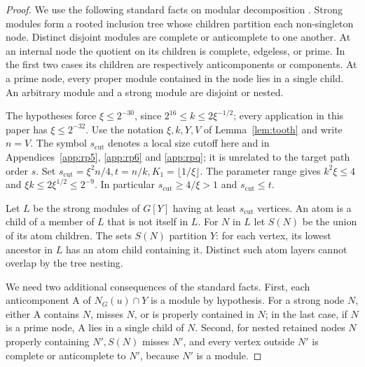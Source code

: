 \documentclass[11pt,a4paper]{article}
\theoremstyle{definition}
\theoremstyle{remark}
\numberwithin{equation}{section}
\begin{document}
\begin{proof}
We use the following standard facts on modular decomposition \cite{gallai}. Strong modules form a rooted inclusion tree whose children partition each non-singleton node. Distinct disjoint modules are complete or anticomplete to one another. At an internal node the quotient on its children is complete, edgeless, or prime. In the first two cases its children are respectively anticomponents or components. At a prime node, every proper module contained in the node lies in a single child. An arbitrary module and a strong module are disjoint or nested.

The hypotheses force \(\xi\le 2^{-30}\), since \(2^{16}\le k\le 2\xi^{-1/2}\); every application in this paper has \(\xi\le 2^{-32}\). Use the notation \(\xi,\allowbreak k,\allowbreak Y,\allowbreak V\) of Lemma~\ref{lem:tooth} and write \(n=V\). The symbol \(s_{\mathrm{cut}}\) denotes a local size cutoff here and in Appendices~\ref{app:rp5}, \ref{app:rp6} and \ref{app:rpq}; it is unrelated to the target path order \(s\). Set \(s_{\mathrm{cut}}=\xi^{2} n/4,\allowbreak  t=n/k,\allowbreak  K_{1}=\lfloor 1/\xi\rfloor\). The parameter range gives \(k^{2} \xi\le\allowbreak 4\) and \(\xi k\le\allowbreak 2\xi^{1/2}\le\allowbreak 2^{-9}\). In particular \(s_{\mathrm{cut}}\ge\allowbreak 4/\xi>1\) and \(s_{\mathrm{cut}}\le\allowbreak t\).

Let \(L\) be the strong modules of \(G[Y]\) having at least \(s_{\mathrm{cut}}\) vertices. An atom is a child of a member of \(L\) that is not itself in \(L\). For \(N\) in \(L\) let \(S(N)\) be the union of its atom children. The sets \(S(N)\) partition \(Y\): for each vertex, its lowest ancestor in \(L\) has an atom child containing it. Distinct such atom layers cannot overlap by the tree nesting.

We need two additional consequences of the standard facts. First, each anticomponent A of \(N_{G}(u) \cap  Y\) is a module by hypothesis. For a strong node \(N\), either A contains \(N\), misses \(N\), or is properly contained in \(N\); in the last case, if \(N\) is a prime node, A lies in a single child of \(N\). Second, for nested retained nodes \(N\) properly containing \(N',\allowbreak  S(N)\) misses \(N'\), and every vertex outside \(N'\) is complete or anticomplete to \(N'\), because \(N'\) is a module.

\end{proof}
\end{document}
